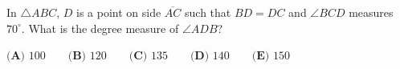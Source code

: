 In $\triangle ABC$, $D$ is a point on side $\overline{AC}$ such that $BD=DC$ and $\angle BCD$ measures $70^\circ$. What is the degree measure of $\angle ADB$?

$\textbf{(A) }100\qquad\textbf{(B) }120\qquad\textbf{(C) }135\qquad\textbf{(D) }140\qquad\textbf{(E) }150$
